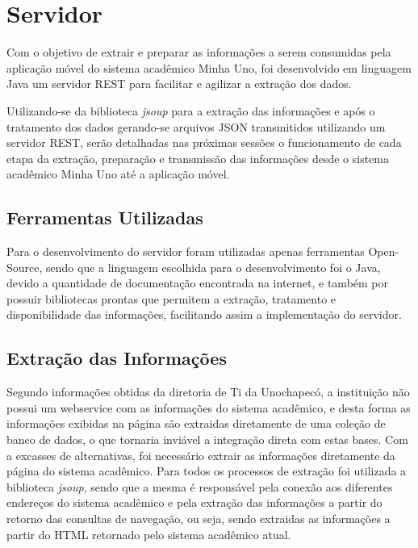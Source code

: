 \chapter{Servidor}

Com o objetivo de extrair e preparar as informações a serem consumidas pela aplicação móvel do sistema acadêmico Minha Uno, foi desenvolvido em linguagem Java um servidor REST para facilitar e agilizar a extração dos dados. 

Utilizando-se da biblioteca \emph{jsoup} para a extração das informações e após o tratamento dos dados gerando-se arquivos JSON transmitidos utilizando um servidor REST, serão detalhadas nas próximas sessões o funcionamento de cada etapa da extração, preparação e transmissão das informações desde o sistema acadêmico Minha Uno até a aplicação móvel.

\section{Ferramentas Utilizadas}
Para o desenvolvimento do servidor foram utilizadas apenas ferramentas Open-Source, sendo que a linguagem escolhida para o desenvolvimento foi o Java, devido a quantidade de documentação encontrada na internet, e também por possuir bibliotecas prontas que permitem a extração, tratamento e disponibilidade das informações, facilitando assim a implementação do servidor.

\section{Extração das Informações}

Segundo informações obtidas da diretoria de Ti da Unochapecó, a instituição não possui um webservice com as informações do sistema acadêmico, e desta forma as informações exibidas na página são extraidas diretamente de uma coleção de banco de dados, o que tornaria inviável a integração direta com estas bases. Com a excasses de alternativas, foi necessário extrair as informações diretamente da página do sistema acadêmico. Para todos os processos de extração foi utilizada a biblioteca \emph{jsoup}, sendo que a mesma é responsável pela conexão aos diferentes endereços do sistema acadêmico e pela extração das informações a partir do retorno das consultas de navegação, ou seja, sendo extraidas as informações a partir do HTML retornado pelo sistema acadêmico atual.

